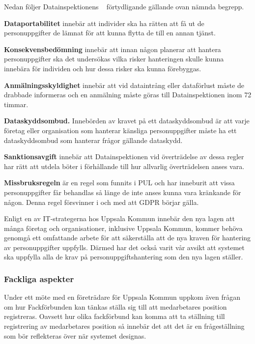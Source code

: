 \documentclass[a4paper,12pt]{article}
\begin{document}
 Nedan följer Datainspektionens ~\cite{GDPRdatainspektionen} förtydligande gällande ovan nämnda begrepp.

 \textbf{Dataportabilitet} innebär att individer ska ha rätten att få ut de personuppgifter de lämnat för att kunna flytta de till en annan tjänst.

 \textbf{Konsekvensbedömning} innebär att innan någon planerar att hantera personuppgifter ska det undersökas vilka risker hanteringen skulle kunna innebära för individen och hur dessa risker ska kunna förebyggas.

 \textbf{Anmälningsskyldighet} innebär att vid dataintrång eller dataförlust måste de drabbade informeras och en anmälning måste göras till Datainspektionen inom 72 timmar.

 \textbf{Dataskyddsombud.} Innebörden av kravet på ett dataskyddsombud är att varje företag eller organisation som hanterar känsliga personuppgifter måste ha ett dataskyddsombud som hanterar frågor gällande dataskydd.

 \textbf{Sanktionsavgift} innebär att Datainspektionen vid överträdelse av dessa regler har rätt att utdela böter i förhållande till hur allvarlig överträdelsen anses vara.

 \textbf{Missbruksregeln} är en regel som funnits i PUL och har inneburit att vissa personuppgifter får behandlas så länge de inte anses kunna vara kränkande för någon. Denna regel försvinner i och med att GDPR börjar gälla.

 Enligt en av IT-strategerna hos Uppsala Kommun innebär den nya lagen att många företag och organisationer, inklusive Uppsala Kommun, kommer behöva genomgå ett omfattande arbete för att säkerställa att de nya kraven för hantering av personuppgifter uppfylls.
 Därmed har det också varit vår avsikt att systemet ska uppfylla alla de krav på personuppgiftshantering som den nya lagen ställer.

 \subsubsection{Fackliga aspekter}
 Under ett möte med en företrädare för Uppsala Kommun uppkom även frågan om hur Fackförbunden kan tänkas ställa sig till att medarbetares position registreras.
 Oavsett hur olika fackförbund kan komma att ta ställning till registrering av medarbetares position så innebär det att det är en frågeställning som bör reflekteras över när systemet designas.

\end{document}
